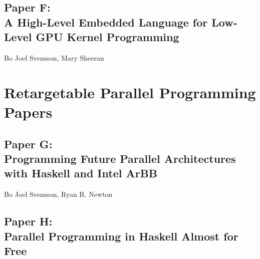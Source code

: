 \documentclass[a4paper]{book}
\newcommand{\paperF}{Paper F}
\newcommand{\paperFTitle}{A High-Level Embedded Language for Low-Level GPU Kernel Programming}
\newcommand{\paperG}{Paper G}
\newcommand{\paperGTitle}{Programming Future Parallel Architectures with Haskell and Intel ArBB}
\newcommand{\paperH}{Paper H}
\newcommand{\paperHTitle}{Parallel Programming in Haskell Almost for Free}
\begin{document}
% 
\cleardoublepage 


\section[\paperFTitle]{\paperF: \\ \paperFTitle}
\label{sec:paperF}


\begin{center} 
Bo Joel Svensson, Mary Sheeran
\end{center}






% 

\chapter{Retargetable Parallel Programming Papers}
\label{chap:ArBB}
% 
\cleardoublepage 


\section[\paperGTitle]{\paperG: \\ \paperGTitle}
\label{sec:paperG}


\begin{center} 
Bo Joel Svensson, Ryan R. Newton
\end{center}




% 
\cleardoublepage 


\section[\paperHTitle]{\paperH: \\ \paperHTitle}
\label{sec:paperH}
\end{document}
